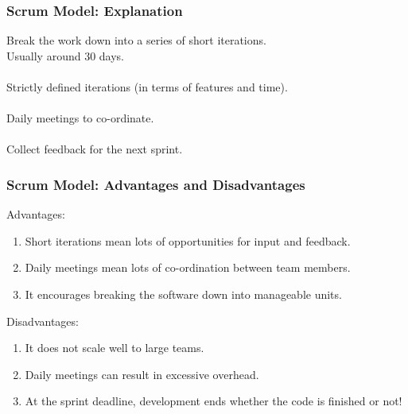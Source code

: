\begin{frame}
\frametitle{Scrum Model: Explanation}
\begin{changemargin}{1.5cm}

Break the work down into a series of short iterations. \\
Usually around 30 days. \\
~\\
Strictly defined iterations (in terms of features and time).\\
~\\
Daily meetings to co-ordinate.\\
~\\
Collect feedback for the next sprint.\\

\end{changemargin}
\end{frame}

\begin{frame}
\frametitle{Scrum Model: Advantages and Disadvantages}
\begin{changemargin}{1.5cm}

Advantages:
\begin{enumerate}
	\item Short iterations mean lots of opportunities for input and feedback. 
	\item Daily meetings mean lots of co-ordination between team members. 
	\item It encourages breaking the software down into manageable units.
\end{enumerate}

Disadvantages:
\begin{enumerate}
	\item It does not scale well to large teams.
	\item Daily meetings can result in excessive overhead.
	\item At the sprint deadline, development ends whether the code is finished or not!
\end{enumerate}

\end{changemargin}
\end{frame}


